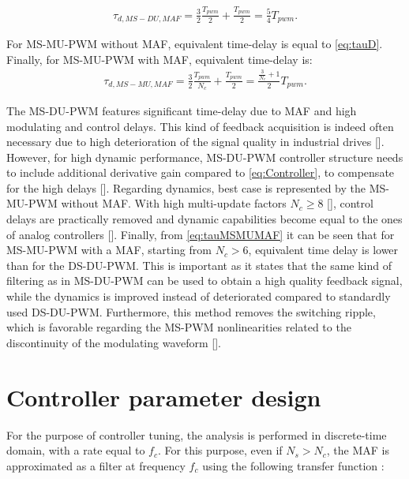 \documentclass[journal]{IEEEtran}
\begin{document}
\begin{equation}
\begin{aligned}
\tau_{d,MS-DU,MAF} = \frac{3}{2} \frac{T_{pwm}}{2} + \frac{T_{pwm}}{2} = \frac{5}{4} T_{pwm}.
\label{eq:tauMSDU} 
\end{aligned}    
\end{equation}

For MS-MU-PWM without MAF, equivalent time-delay is equal to \eqref{eq:tauD}.
Finally, for MS-MU-PWM with MAF, equivalent time-delay is:
\begin{equation}
\begin{aligned}
\tau_{d,MS-MU,MAF} = \frac{3}{2} \frac{T_{pwm}}{N_c} + \frac{T_{pwm}}{2} = \frac{\frac{3}{N_c}+1}{2}T_{pwm}.
\label{eq:tauMSMUMAF} 
\end{aligned}    
\end{equation}

The MS-DU-PWM features significant time-delay due to MAF and high modulating and control delays. This kind of feedback acquisition is indeed often necessary due to high deterioration of the signal quality in industrial drives []. However, for high dynamic performance, MS-DU-PWM controller structure needs to include additional derivative gain compared to \eqref{eq:Controller}, to compensate for the high delays []. Regarding dynamics, best case is represented by the MS-MU-PWM without MAF. With high multi-update factors $N_c \geq 8$ [], control delays are practically removed and dynamic capabilities become equal to the ones of analog controllers [].
Finally, from \eqref{eq:tauMSMUMAF} it can be seen that for MS-MU-PWM with a MAF, starting from $N_c>6$, equivalent time delay is lower than for the DS-DU-PWM. This is important as it states that the same kind of filtering as in MS-DU-PWM can be used to obtain a high quality feedback signal, while the dynamics is improved instead of deteriorated compared to standardly used DS-DU-PWM. Furthermore, this method removes the switching ripple, which is favorable regarding the MS-PWM nonlinearities related to the discontinuity of the modulating waveform []. 

\section{Controller parameter design}
For the purpose of controller tuning, the analysis is performed in discrete-time domain, with a rate equal to $f_c$. For this purpose, even if $N_s > N_c$, the MAF is approximated as a filter at frequency $f_c$ using the following transfer function \cite{vuksa2016}:
\end{document}
